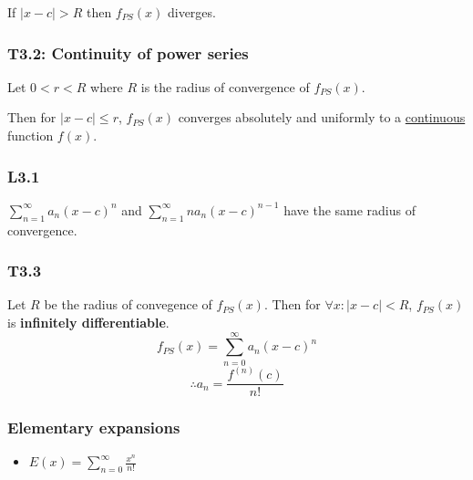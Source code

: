 \documentclass{article}
\begin{document}
\begin{multicols*}{3}
If $|x-c|>R$ then $f_{PS}(x)$ diverges.

\subsubsection*{T3.2: Continuity of power series}
Let $0<r<R$ where $R$ is the radius of
convergence of $f_{PS}(x)$.

Then for $|x-c|\leq r$, $f_{PS}(x)$
converges absolutely and uniformly
to a \underline{continuous} function $f(x)$.

\subsubsection*{L3.1}
$\displaystyle\sum_{n=1}^{\infty}a_n(x-c)^n$
and $\displaystyle\sum_{n=1}^{\infty}n a_n(x-c)^{n-1}$
have the same radius of convergence.

\subsubsection*{T3.3}
Let $R$ be the radius of convegence of
$f_{PS}(x)$. Then for $\forall x:|x-c|<R$,
$f_{PS}(x)$ is \textbf{infinitely differentiable}.
$$f_{PS}(x)=\sum_{n=0}^{\infty}a_n(x-c)^n$$
$$\therefore a_n=\frac{f^{(n)}(c)}{n!}$$

\subsubsection*{Elementary expansions}
\begin{itemize}
    \item $\displaystyle E(x)
    =\sum_{n=0}^{\infty}\frac{x^n}{n!}$
\end{itemize}
\end{multicols*}
\end{document}
